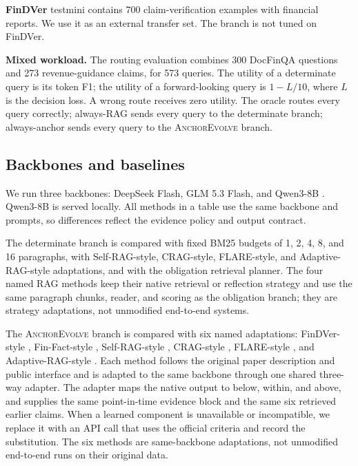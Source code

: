 \documentclass[11pt]{article}
\newcommand{\anchor}{\textsc{AnchorEvolve}}
\begin{document}
\textbf{FinDVer} \citep{zhao2024findver} testmini contains 700 claim-verification examples with financial reports. We use it as an external transfer set. The branch is not tuned on FinDVer.

\textbf{Mixed workload.} The routing evaluation combines 300 DocFinQA questions and 273 revenue-guidance claims, for 573 queries. The utility of a determinate query is its token F1; the utility of a forward-looking query is $1-L/10$, where $L$ is the decision loss. A wrong route receives zero utility. The oracle routes every query correctly; always-RAG sends every query to the determinate branch; always-anchor sends every query to the \anchor{} branch.

\subsection{Backbones and baselines}
We run three backbones: DeepSeek Flash, GLM 5.3 Flash, and Qwen3-8B \citep{qwen2025qwen3}. Qwen3-8B is served locally. All methods in a table use the same backbone and prompts, so differences reflect the evidence policy and output contract.

The determinate branch is compared with fixed BM25 budgets of 1, 2, 4, 8, and 16 paragraphs, with Self-RAG-style, CRAG-style, FLARE-style, and Adaptive-RAG-style adaptations, and with the obligation retrieval planner. The four named RAG methods keep their native retrieval or reflection strategy and use the same paragraph chunks, reader, and scoring as the obligation branch; they are strategy adaptations, not unmodified end-to-end systems. 

The \anchor{} branch is compared with six named adaptations: FinDVer-style \citep{zhao2024findver}, Fin-Fact-style \citep{rangapur2025finfact}, Self-RAG-style \citep{asai2024selfrag}, CRAG-style \citep{yan2024crag}, FLARE-style \citep{jiang2023flare}, and Adaptive-RAG-style \citep{jeong2024adaptiverag}. Each method follows the original paper description and public interface and is adapted to the same backbone through one shared three-way adapter. The adapter maps the native output to below, within, and above, and supplies the same point-in-time evidence block and the same six retrieved earlier claims. When a learned component is unavailable or incompatible, we replace it with an API call that uses the official criteria and record the substitution. The six methods are same-backbone adaptations, not unmodified end-to-end runs on their original data.
\end{document}
